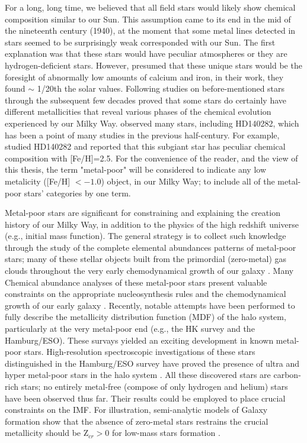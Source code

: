 For a long, long time, we believed that all field stars would likely show chemical composition similar to our Sun. This assumption came to its end in the mid of the nineteenth century (1940), at the moment that some metal lines detected in stars seemed to be surprisingly weak corresponded with our Sun. The first explanation was that these stars would have peculiar atmospheres or they are hydrogen-deficient stars. However, \citet{1951ApJ...114...52C} presumed that these unique stars would be the foresight of abnormally low amounts of calcium and iron, in their work, they found $\sim$ 1/20th the solar values. Following studies on before-mentioned stars through the subsequent few decades proved that some stars do certainly have different metallicities that reveal various phases of the chemical evolution experienced by our Milky Way. \citet{1951ApJ...114...52C} observed many stars, including HD140282, which has been a point of many studies in the previous half-century.  For example, \citet{2001ApJ...561.1034N} studied HD140282 and reported that this subgiant star has peculiar chemical composition with [Fe/H]=2.5. For the convenience of the reader, and the view of this thesis, the term "metal-poor" will be considered to indicate any low metalicity ([Fe/H] $< -1.0$) object, in our Milky Way; to include all of the metal-poor stars' categories by one term.


Metal-poor stars are significant for constraining and explaining the creation history of our Milky Way, in addition to the physics of the high redshift universe (e.g., initial mass function).  The general strategy is to collect such knowledge through the study of the complete elemental abundances patterns of metal-poor stars; many of these stellar objects built from the primordial (zero-metal) gas clouds throughout the very early chemodynamical growth of our galaxy \citep[e.g.,][]{2005ARA&A..43..531B}. Many Chemical abundance analyses of these metal-poor stars present valuable constraints on the appropriate nucleosynthesis rules and the chemodynamical growth of our early galaxy \citep{1990A&AS...86...85Z,1991A&A...244..425Z,1995AJ....109.2757M,1998AJ....115.1640M,2004A&A...416.1117C,2005A&A...435..373B,2008ApJ...672..320C}. Recently, notable attempts have been performed to fully describe the metallicity distribution function (MDF) of the halo system, particularly at the very metal-poor end (e.g., the HK survey and the Hamburg/ESO).  These survays yielded an exciting development in known metal-poor stars. High-resolution spectroscopic investigations of these stars distinguished in the Hamburg/ESO survey have proved the presence of ultra and hyper metal-poor stars in the halo system \citep{2002Natur.419..904C,2005Natur.434..871F,2007ApJ...670..774N}. All these discovered stars are carbon-rich stars; no entirely metal-free (compose of only hydrogen and helium) stars have been observed thus far. Their results could be employed to place crucial constraints on the IMF.
For illustration, semi-analytic models of Galaxy formation show that the absence of zero-metal stars restrains the crucial metallicity should be  Z$_{cr} > 0$  for low-mass stars formation \citep{2002ApJ...571...30S,2007MNRAS.381..647S}.



